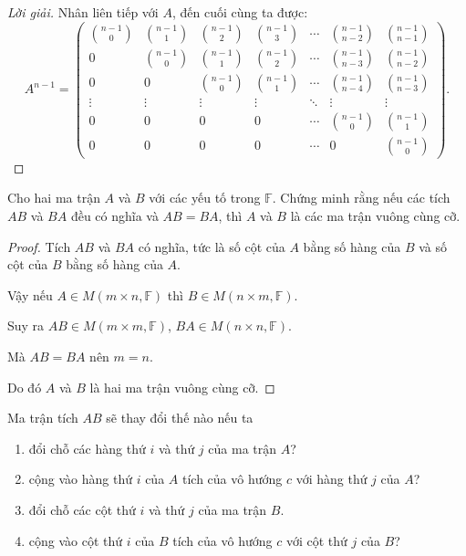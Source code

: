 \begin{proof}[Lời giải]
    Nhân liên tiếp với $A$, đến cuối cùng ta được:
    \[
        A^{n-1} =
        \begin{pmatrix}
            \binom{n-1}{0} & \binom{n-1}{1} & \binom{n-1}{2} & \binom{n-1}{3} & \cdots & \binom{n-1}{n-2} & \binom{n-1}{n-1} \\
            0              & \binom{n-1}{0} & \binom{n-1}{1} & \binom{n-1}{2} & \cdots & \binom{n-1}{n-3} & \binom{n-1}{n-2} \\
            0              & 0              & \binom{n-1}{0} & \binom{n-1}{1} & \cdots & \binom{n-1}{n-4} & \binom{n-1}{n-3} \\
            \vdots         & \vdots         & \vdots         & \vdots         & \ddots & \vdots           & \vdots           \\
            0              & 0              & 0              & 0              & \cdots & \binom{n-1}{0}   & \binom{n-1}{1}   \\
            0              & 0              & 0              & 0              & \cdots & 0                & \binom{n-1}{0}
        \end{pmatrix}.
    \]
\end{proof}

\begin{exercise}
    Cho hai ma trận $A$ và $B$ với các yếu tố trong $\mathbb{F}$. Chứng minh rằng nếu các tích $AB$ và $BA$ đều có nghĩa và $AB = BA$, thì $A$ và $B$ là các ma trận vuông cùng cỡ.
\end{exercise}

\begin{proof}
    Tích $AB$ và $BA$ có nghĩa, tức là số cột của $A$ bằng số hàng của $B$ và số cột của $B$ bằng số hàng của $A$.
    
    Vậy nếu $A\in M(m\times n,\mathbb{F})$ thì $B\in M(n\times m, \mathbb{F})$.
    
    Suy ra $AB\in M(m\times m,\mathbb{F})$, $BA\in M(n\times n,\mathbb{F})$.
    
    Mà $AB = BA$ nên $m = n$.
    
    Do đó $A$ và $B$ là hai ma trận vuông cùng cỡ.
\end{proof}

\begin{exercise}
    Ma trận tích $AB$ sẽ thay đổi thế nào nếu ta
    \begin{enumerate}[label = (\alph*)]
        \item đổi chỗ các hàng thứ $i$ và thứ $j$ của ma trận $A$?
        \item cộng vào hàng thứ $i$ của $A$ tích của vô hướng $c$ với hàng thứ $j$ của $A$?
        \item đổi chỗ các cột thứ $i$ và thứ $j$ của ma trận $B$.
        \item cộng vào cột thứ $i$ của $B$ tích của vô hướng $c$ với cột thứ $j$ của $B$?
    \end{enumerate}
\end{exercise}

